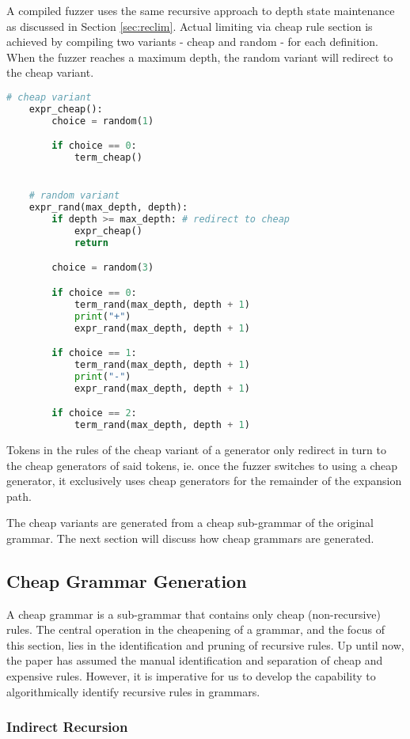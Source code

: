 \documentclass[8pt, twoside]{extarticle}
\begin{document}
A compiled fuzzer uses the same recursive approach to depth state maintenance as discussed in Section \ref{sec:reclim}. Actual limiting via cheap rule section is achieved by compiling two variants - cheap and random - for each definition. When the fuzzer reaches a maximum depth, the random variant will redirect to the cheap variant.

\begin{lstlisting}[gobble=2, language=Python, caption={Compiled fuzzer depth limiting}]
	# cheap variant
	expr_cheap():
		choice = random(1)

		if choice == 0:
			term_cheap()


	# random variant
	expr_rand(max_depth, depth):
		if depth >= max_depth: # redirect to cheap
			expr_cheap()
			return

		choice = random(3)

		if choice == 0:
			term_rand(max_depth, depth + 1)
			print("+")
			expr_rand(max_depth, depth + 1)

		if choice == 1:
			term_rand(max_depth, depth + 1)
			print("-")
			expr_rand(max_depth, depth + 1)

		if choice == 2:
			term_rand(max_depth, depth + 1)
\end{lstlisting}

Tokens in the rules of the cheap variant of a generator only redirect in turn to the cheap generators of said tokens, ie. once the fuzzer switches to using a cheap generator, it exclusively uses cheap generators for the remainder of the expansion path.

The cheap variants are generated from a cheap sub-grammar of the original grammar. The next section will discuss how cheap grammars are generated.

\subsection{Cheap Grammar Generation} \label{sec:chpgram}

A cheap grammar is a sub-grammar that contains only cheap (non-recursive) rules. The central operation in the cheapening of a grammar, and the focus of this section, lies in the identification and pruning of recursive rules. Up until now, the paper has assumed the manual identification and separation of cheap and expensive rules. However, it is imperative for us to develop the capability to algorithmically identify recursive rules in grammars.

\subsubsection{Indirect Recursion} \label{sec:indrec}
\end{document}
